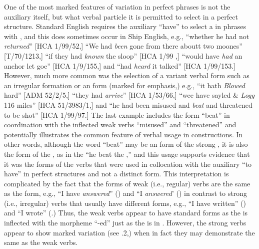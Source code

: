   One of the most marked features of variation in perfect  phrases is not the auxiliary itself, but what verbal particle it is permitted to select in a perfect structure. Standard English requires the auxiliary “have” to select a  in  phrases with , and this does sometimes occur in Ship English, e.g., “whether he had not \textit{returned}” [HCA 1/99/52,] “We had \textit{been} gone from there aboutt two moones” [T/70/1213,] “if they had \textit{known} the sloop” [HCA 1/99  \citealt{Islands1722},] “would have \textit{had} an anchor let goe” [HCA 1/9/155,] and “had \textit{heard} it talked” [HCA 1/99/153.] However, much more common was the selection of a variant verbal form such as an irregular formation or an  form (marked for emphasis,) e.g., “it hath \textit{Blowed} hard” [ADM 52/2/5,] “they had \textit{arrive}” [HCA 1/53/66,] “wee have sayled \& \textit{Logg} 116 miles” [HCA 51/3983/1,] and “he had been misused and \textit{beat} and threatened to be shot” [HCA 1/99/97.] The last example includes the  form “beat” in coordination with the inflected weak verbs “misused” and “threatened” and potentially illustrates the common feature of  verbal usage in  constructions. In other words, although the word “beat” may be an  form of the strong , it is also the form of the , as in the  “he beat the ,” and this usage supports evidence that it was the  forms of the verbs that were used in collocation with the auxiliary “to have” in perfect structures and not a distinct  form. This interpretation is complicated by the fact that the  forms of weak (i.e., regular) verbs are the same as the  form, e.g., “I have \textit{answered}” () and “I \textit{answered}’ () in contrast to strong (i.e., irregular) verbs that usually have different  forms, e.g., “I have written” () and “I wrote” (.) Thus, the weak verbs appear to have standard  forms as the  is inflected with the morpheme “-ed” just as the  is in . However, the strong verbs appear to show marked variation (see .2,) when in fact they may demonstrate the same  as the weak verbs. 

